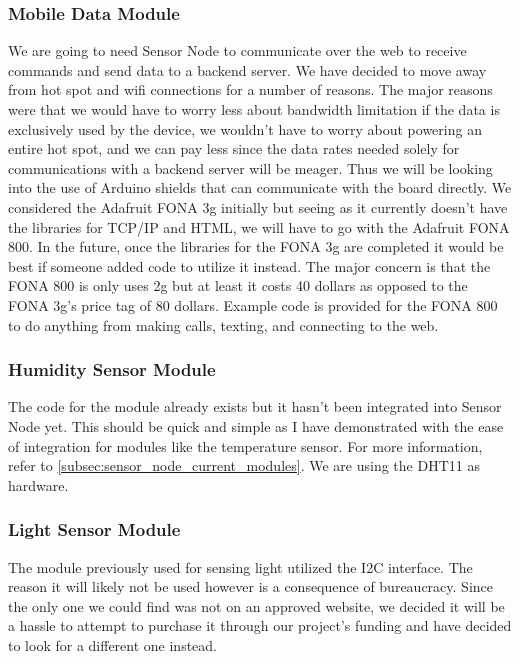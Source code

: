 \documentclass{article}
\begin{document}
\subsubsection{Mobile Data Module}

We are going to need Sensor Node to communicate over the web to receive commands and send data to a backend server. We have decided to move away from hot spot and wifi connections for a number of reasons. The major reasons were that we would have to worry less about bandwidth limitation if the data is exclusively used by the device, we wouldn't have to worry about powering an entire hot spot, and we can pay less since the data rates needed solely for communications with a backend server will be meager. Thus we will be looking into the use of Arduino shields that can communicate with the board directly. We considered the Adafruit FONA 3g initially but seeing as it currently doesn't have the libraries for TCP/IP and HTML, we will have to go with the Adafruit FONA 800. In the future, once the libraries for the FONA 3g are completed it would be best if someone added code to utilize it instead. The major concern is that the FONA 800 is only uses 2g but at least it costs 40 dollars as opposed to the FONA 3g's price tag of 80 dollars. Example code is provided for the FONA 800 to do anything from making calls, texting, and connecting to the web.

\subsubsection{Humidity Sensor Module}

The code for the module already exists but it hasn't been integrated into Sensor Node yet. This should be quick and simple as I have demonstrated with the ease of integration for modules like the temperature sensor. For more information, refer to \autoref{subsec:sensor_node_current_modules}. We are using the DHT11 as hardware.

\subsubsection{Light Sensor Module}

The module previously used for sensing light utilized the I2C interface. The reason it will likely not be used however is a consequence of bureaucracy. Since the only one we could find was not on an approved website, we decided it will be a hassle to attempt to purchase it through our project's funding and have decided to look for a different one instead.
\end{document}
